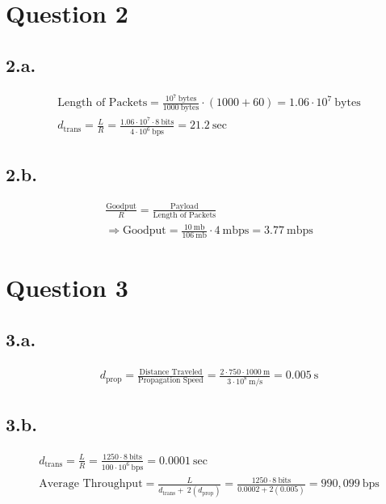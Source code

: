 \documentclass[12pt]{article}
\begin{document}
\section{Question 2}

\subsection{2.a.}

\begin{gather}
    \text{Length of Packets} = \frac{10^7 \ \text{bytes}}{1000 \
    \text{bytes}} \cdot (1000 + 60) = 1.06 \cdot 10^7 \ \text{bytes}\\
    d_{\text{trans}} = \frac{L}{R} = \frac{1.06 \cdot 10^7 \cdot 8\ \text{bits}}{4 \cdot 10^6 \ \text{bps}} = 21.2 \ \text{sec}
\end{gather}

\subsection{2.b.}

\begin{gather}
    \frac{\text{Goodput}}{R} = \frac{\text{Payload}}{\text{Length of Packets}} \\
    \Longrightarrow \text{Goodput} = \frac{10 \ \text{mb}}{106 \ \text{mb}} \cdot 4 \ \text{mbps} = 3.77 \ \text{mbps}
\end{gather}


\section{Question 3}

\subsection{3.a.}

\begin{gather}
    d_{\text{prop}} = \frac{\text{Distance Traveled}}{\text{Propagation Speed}} = \frac{2 \cdot 750 \cdot 1000 \ \text{m}}{3 \cdot 10^{8} \ \text{m/s}} = 0.005 \ \text{s}
\end{gather}

\subsection{3.b.}

\begin{gather}
    d_{\text{trans}} = \frac{L}{R} = \frac{1250 \cdot 8\ \text{bits}}{100 \cdot 10^6 \ \text{bps}} = 0.0001 \ \text{sec}\\
    \text{Average Throughput} = \frac{L}{d_{\text{trans}} + \ 2(d_{\text{prop}})} = \frac{1250 \cdot 8\ \text{bits}}{0.0002 + 2(0.005)} = 990,099 \ \text{bps}
\end{gather}
\end{document}
